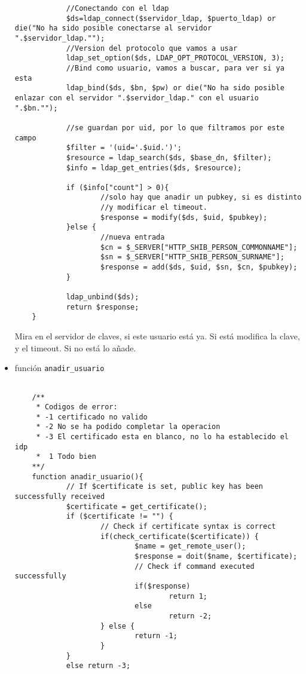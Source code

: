 \begin{itemize}
\begin{lstlisting}
            //Conectando con el ldap
            $ds=ldap_connect($servidor_ldap, $puerto_ldap) or die("No ha sido posible conectarse al servidor ".$servidor_ldap."");
            //Version del protocolo que vamos a usar
            ldap_set_option($ds, LDAP_OPT_PROTOCOL_VERSION, 3);
            //Bind como usuario, vamos a buscar, para ver si ya esta
            ldap_bind($ds, $bn, $pw) or die("No ha sido posible enlazar con el servidor ".$servidor_ldap." con el usuario ".$bn."");

            //se guardan por uid, por lo que filtramos por este campo
            $filter = '(uid='.$uid.')';
            $resource = ldap_search($ds, $base_dn, $filter);
            $info = ldap_get_entries($ds, $resource);

            if ($info["count"] > 0){
                    //solo hay que anadir un pubkey, si es distinto
                    //y modificar el timeout.
                    $response = modify($ds, $uid, $pubkey);
            }else {
                    //nueva entrada
                    $cn = $_SERVER["HTTP_SHIB_PERSON_COMMONNAME"];
                    $sn = $_SERVER["HTTP_SHIB_PERSON_SURNAME"];
                    $response = add($ds, $uid, $sn, $cn, $pubkey);
            }

            ldap_unbind($ds);
            return $response;
    }
    \end{lstlisting}


     Mira en el servidor de claves, si este usuario está ya. Si está
     modifica la clave, y el timeout. Si no está lo añade.

    \item función \texttt{anadir\_usuario}
    \begin{lstlisting}

    /**
     * Codigos de error:
     * -1 certificado no valido
     * -2 No se ha podido completar la operacion
     * -3 El certificado esta en blanco, no lo ha establecido el idp
     *  1 Todo bien 
    **/
    function anadir_usuario(){
            // If $certificate is set, public key has been successfully received
            $certificate = get_certificate();
            if ($certificate != "") {
                    // Check if certificate syntax is correct
                    if(check_certificate($certificate)) {
                            $name = get_remote_user();
                            $response = doit($name, $certificate);
                            // Check if command executed successfully
                            if($response)
                                    return 1;
                            else 
                                    return -2;
                    } else {
                            return -1;
                    }
            }
            else return -3;
    

\end{lstlisting}
\end{itemize}
